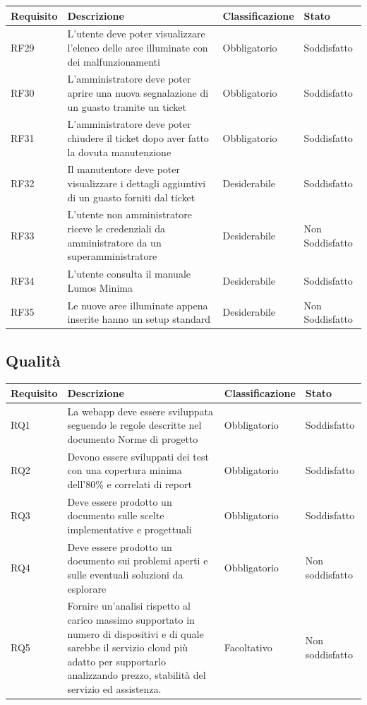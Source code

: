\documentclass[12pt]{article}
\begin{document}
\begin{tabular}{ |p{1.8cm}|p{5.2cm}|p{2.5cm}| p{3.5cm}| }
	\hline
	Requisito& Descrizione &Classificazione & Stato \\
	\hline	
	RF29	 & L'utente deve poter visualizzare l'elenco delle aree illuminate con dei malfunzionamenti & Obbligatorio & Soddisfatto \\
	\hline				
	RF30	 & L'amministratore deve poter aprire una nuova segnalazione di un guasto tramite un ticket & Obbligatorio & Soddisfatto \\
	\hline				
	RF31	 & L'amministratore deve poter chiudere il ticket dopo aver fatto la dovuta manutenzione & Obbligatorio & Soddisfatto \\
	\hline				
	RF32	 & Il manutentore deve poter visualizzare i dettagli aggiuntivi di un guasto forniti dal ticket & Desiderabile & Soddisfatto \\
	\hline				
	RF33	 & L'utente non amministratore riceve le credenziali da amministratore da un superamministratore & Desiderabile & Non Soddisfatto \\
	\hline				
	RF34	 & L'utente consulta il manuale Lumos Minima & Desiderabile & Soddisfatto \\
	\hline				
	RF35	 & Le nuove aree illuminate appena inserite hanno un setup standard & Desiderabile & Non Soddisfatto \\
	\hline				
	\end{tabular}
	
	\subsection{Qualità}
	\begin{tabular}{ |p{1.8cm}|p{5.2cm}|p{3cm}| p{2cm}| }
	\hline
	Requisito& Descrizione &Classificazione & Stato \\
	\hline
	RQ1 & La webapp deve essere sviluppata seguendo le regole descritte nel documento Norme di progetto & Obbligatorio & Soddisfatto \\
	RQ2 & Devono essere sviluppati dei test con una copertura minima dell'80\% e correlati di report & Obbligatorio & Soddisfatto\\
	RQ3 & Deve essere prodotto un documento sulle scelte implementative e progettuali & Obbligatorio & Soddisfatto \\
	RQ4 & Deve essere prodotto un documento sui problemi aperti e sulle eventuali soluzioni da esplorare & Obbligatorio & Non soddisfatto \\
	RQ5 & Fornire un’analisi rispetto al carico massimo supportato in numero di dispositivi e di quale sarebbe il servizio cloud più adatto per supportarlo analizzando prezzo, stabilità del servizio ed assistenza.  &  Facoltativo & Non soddisfatto \\
	\hline
	
	\end{tabular}
\end{document}
